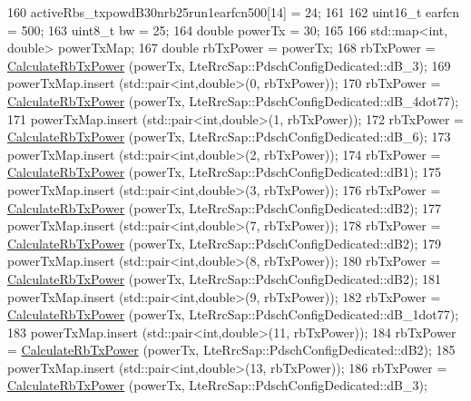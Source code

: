 \begin{DoxyCode}
160     activeRbs\_txpowdB30nrb25run1earfcn500[14] = 24;
161 
162     uint16\_t earfcn = 500;
163     uint8\_t bw = 25;
164     \textcolor{keywordtype}{double} powerTx = 30;
165 
166     std::map<int, double> powerTxMap;
167     \textcolor{keywordtype}{double} rbTxPower = powerTx;
168     rbTxPower = \hyperlink{classLteDownlinkPowerControlTestSuite_acbda226a1db61d5328141d80aca96447}{CalculateRbTxPower} (powerTx, LteRrcSap::PdschConfigDedicated::dB\_3);
169     powerTxMap.insert (std::pair<int,double>(0, rbTxPower));
170     rbTxPower = \hyperlink{classLteDownlinkPowerControlTestSuite_acbda226a1db61d5328141d80aca96447}{CalculateRbTxPower} (powerTx, LteRrcSap::PdschConfigDedicated::dB\_4dot77);
171     powerTxMap.insert (std::pair<int,double>(1, rbTxPower));
172     rbTxPower = \hyperlink{classLteDownlinkPowerControlTestSuite_acbda226a1db61d5328141d80aca96447}{CalculateRbTxPower} (powerTx, LteRrcSap::PdschConfigDedicated::dB\_6);
173     powerTxMap.insert (std::pair<int,double>(2, rbTxPower));
174     rbTxPower = \hyperlink{classLteDownlinkPowerControlTestSuite_acbda226a1db61d5328141d80aca96447}{CalculateRbTxPower} (powerTx, LteRrcSap::PdschConfigDedicated::dB1);
175     powerTxMap.insert (std::pair<int,double>(3, rbTxPower));
176     rbTxPower = \hyperlink{classLteDownlinkPowerControlTestSuite_acbda226a1db61d5328141d80aca96447}{CalculateRbTxPower} (powerTx, LteRrcSap::PdschConfigDedicated::dB2);
177     powerTxMap.insert (std::pair<int,double>(7, rbTxPower));
178     rbTxPower = \hyperlink{classLteDownlinkPowerControlTestSuite_acbda226a1db61d5328141d80aca96447}{CalculateRbTxPower} (powerTx, LteRrcSap::PdschConfigDedicated::dB2);
179     powerTxMap.insert (std::pair<int,double>(8, rbTxPower));
180     rbTxPower = \hyperlink{classLteDownlinkPowerControlTestSuite_acbda226a1db61d5328141d80aca96447}{CalculateRbTxPower} (powerTx, LteRrcSap::PdschConfigDedicated::dB2);
181     powerTxMap.insert (std::pair<int,double>(9, rbTxPower));
182     rbTxPower = \hyperlink{classLteDownlinkPowerControlTestSuite_acbda226a1db61d5328141d80aca96447}{CalculateRbTxPower} (powerTx, LteRrcSap::PdschConfigDedicated::dB\_1dot77);
183     powerTxMap.insert (std::pair<int,double>(11, rbTxPower));
184     rbTxPower = \hyperlink{classLteDownlinkPowerControlTestSuite_acbda226a1db61d5328141d80aca96447}{CalculateRbTxPower} (powerTx, LteRrcSap::PdschConfigDedicated::dB2);
185     powerTxMap.insert (std::pair<int,double>(13, rbTxPower));
186     rbTxPower = \hyperlink{classLteDownlinkPowerControlTestSuite_acbda226a1db61d5328141d80aca96447}{CalculateRbTxPower} (powerTx, LteRrcSap::PdschConfigDedicated::dB\_3);

\end{DoxyCode}
